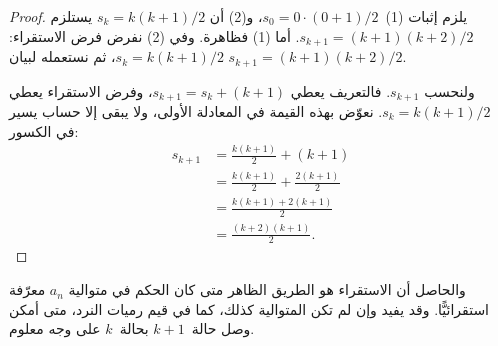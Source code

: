 \documentclass[../../../include/open-logic-section]{subfiles}
\begin{document}
\begin{proof}
  يلزم إثبات (1)~$s_0 = 0\cdot(0 + 1)/2$، و(2) أن
  $s_k = k(k+1)/2$ يستلزم $s_{k+1} = (k+1)(k+2)/2$. أما (1) فظاهرة.
  وفي (2) نفرض فرض الاستقراء: $s_k = k(k+1)/2$، ثم نستعمله لبيان
  $s_{k+1} = (k+1)(k+2)/2$.

  ولنحسب $s_{k+1}$. فالتعريف يعطي
  $s_{k+1} = s_k + (k+1)$، وفرض الاستقراء يعطي
  $s_k = k(k+1)/2$. نعوّض بهذه القيمة في المعادلة الأولى، ولا يبقى
  إلا حساب يسير في الكسور:
  \begin{align*}
    s_{k+1} & = \frac{k(k+1)}{2} + (k+1)\\
    & = \frac{k(k+1)}{2} + \frac{2(k+1)}{2}\\
    & = \frac{k(k+1) + 2(k+1)}{2}\\
    & = \frac{(k+2)(k+1)}{2}.
  \end{align*}
\end{proof}

والحاصل أن الاستقراء هو الطريق الظاهر متى كان الحكم في متوالية $a_n$
معرّفة استقرائيًّا. وقد يفيد وإن لم تكن المتوالية كذلك، كما في قيم
رميات النرد، متى أمكن وصل حالة~$k+1$ بحالة~$k$ على وجه معلوم.
\end{document}
